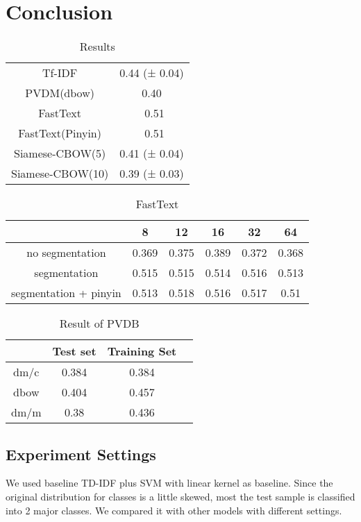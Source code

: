 \chapter{Conclusion}

\begin{table}[]
\centering
\caption{Results}
\label{resultAll}
\begin{tabular}{|c|c|}
\hline
Tf-IDF   & 0.44 (± 0.04) \\
PVDM(dbow) & 0.40    \\
FastText &  ~0.51   \\
FastText(Pinyin) &  ~0.51  \\
Siamese-CBOW(5) & 0.41 (± 0.04) \\
Siamese-CBOW(10) & 0.39 (± 0.03) \\

\hline
\end{tabular}
\end{table}

\begin{table}[]
\centering
\caption{FastText}
\label{fasttext}
\begin{tabular}{|c|c|c|c|c|c|}
\hline
   & 8 & 12 & 16 & 32 & 64 \\
\hline
no segmentation  & 0.369 & 0.375 & 0.389 & 0.372 & 0.368 \\
segmentation  & 0.515 & 0.515 & 0.514 & 0.516 & 0.513 \\
segmentation + pinyin  & 0.513 & 0.518 & 0.516 & 0.517 & 0.51 \\
\hline
\end{tabular}
\end{table}

\begin{table}[]
\centering
\caption{Result of PVDB}
\label{resultAll}
\begin{tabular}{|c|c|c|c|}
\hline
      & Test set & Training Set \\
\hline
dm/c  & 0.384 &  0.384 \\
dbow &  0.404  & 0.457 \\
dm/m &  0.38  & 0.436 \\
\hline
\end{tabular}
\end{table}


\section{Experiment Settings}


We used baseline TD-IDF plus SVM with linear kernel as baseline. 
Since the original distribution for classes is a little skewed, most the test sample is classified into 2 major classes.
We compared it with other models with different settings. \\

